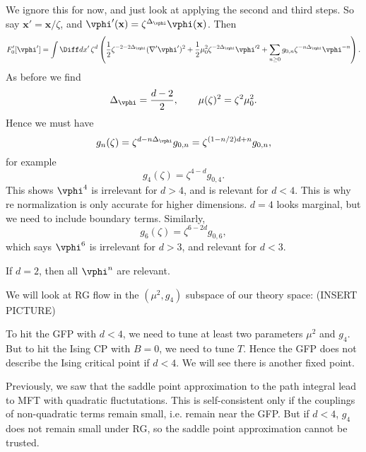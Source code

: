 \documentclass[12pt]{article}
\begin{document}
We ignore this for now, and just look at applying the second and third steps. So say $\mathbf{x}' = \mathbf{x}/\zeta$, and $\vphi'(\mathbf{x}) = \zeta^{\Delta_{\vphi}} \vphi(\mathbf{x})$. Then
\[
	F_0'[\vphi'] = \int \Diff d x'\, \zeta^{d} \left( \frac{1}{2} \zeta^{-2 - 2 \Delta_{\vphi}}(\nabla' \vphi')^2 + \frac{1}{2} \mu_0^2 \zeta^{-2 \Delta_{\vphi}} \vphi'^2 + \sum_{n \geq 0} g_{0, n} \zeta^{-n \Delta_{\vphi}} \vphi^{-n} \right).
\]
As before we find
\[
\Delta_{\vphi} = \frac{d - 2}{2} , \qquad \mu(\zeta)^2 = \zeta^2 \mu_0^2.
\]
Hence we must have
\[
g_n(\zeta) = \zeta^{d - n \Delta_{\vphi}} g_{0, n} = \zeta^{(1 - n/2)d + n} g_{0, n},
\]
for example
\[
g_4(\zeta) = \zeta^{4 - d} g_{0, 4}.
\]
This shows $\vphi^{4}$ is irrelevant for $d > 4$, and is relevant for $d < 4$. This is why re normalization is only accurate for higher dimensions. $d = 4$ looks marginal, but we need to include boundary terms. Similarly,
\[
g_6(\zeta) = \zeta^{6 - 2d} g_{0, 6},
\]
which says $\vphi^{6}$ is irrelevant for $d > 3$, and relevant for $d < 3$.

If $d = 2$, then all $\vphi^{n}$ are relevant.

We will look at RG flow in the $(\mu^2, g_4)$ subspace of our theory space: (INSERT PICTURE)

To hit the GFP with $d < 4$, we need to tune at least two parameters $\mu^2$ and $g_4$. But to hit the Ising CP with $B = 0$, we need to tune $T$. Hence the GFP does not describe the Ising critical point if $d < 4$. We will see there is another fixed point.

Previously, we saw that the saddle point approximation to the path integral lead to MFT with quadratic fluctutations. This is self-consistent only if the couplings of non-quadratic terms remain small, i.e. remain near the GFP. But if $d < 4$, $g_4$ does not remain small under RG, so the saddle point approximation cannot be trusted.



\newpage

\printindex
\end{document}
